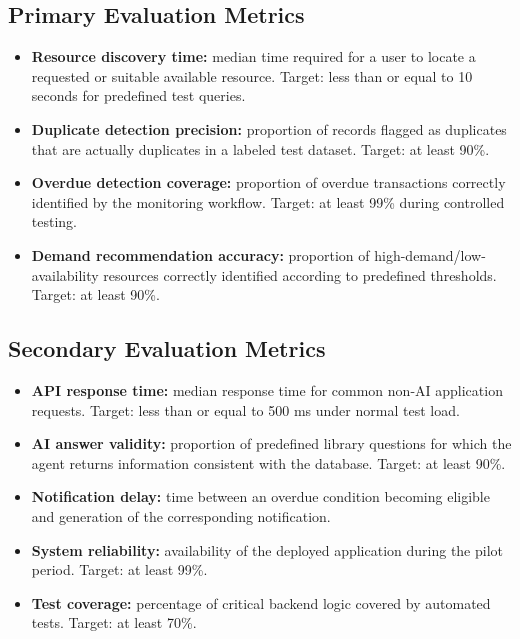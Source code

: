 \documentclass[11pt]{article}
\begin{document}
\subsection{Primary Evaluation Metrics}
\begin{itemize}
    \item \textbf{Resource discovery time:} median time required for a user to locate a requested or suitable available resource. Target: less than or equal to 10 seconds for predefined test queries.
    \item \textbf{Duplicate detection precision:} proportion of records flagged as duplicates that are actually duplicates in a labeled test dataset. Target: at least 90\%.
    \item \textbf{Overdue detection coverage:} proportion of overdue transactions correctly identified by the monitoring workflow. Target: at least 99\% during controlled testing.
    \item \textbf{Demand recommendation accuracy:} proportion of high-demand/low-availability resources correctly identified according to predefined thresholds. Target: at least 90\%.
\end{itemize}

\subsection{Secondary Evaluation Metrics}
\begin{itemize}
    \item \textbf{API response time:} median response time for common non-AI application requests. Target: less than or equal to 500 ms under normal test load.
    \item \textbf{AI answer validity:} proportion of predefined library questions for which the agent returns information consistent with the database. Target: at least 90\%.
    \item \textbf{Notification delay:} time between an overdue condition becoming eligible and generation of the corresponding notification.
    \item \textbf{System reliability:} availability of the deployed application during the pilot period. Target: at least 99\%.
    \item \textbf{Test coverage:} percentage of critical backend logic covered by automated tests. Target: at least 70\%.
\end{itemize}
\end{document}
